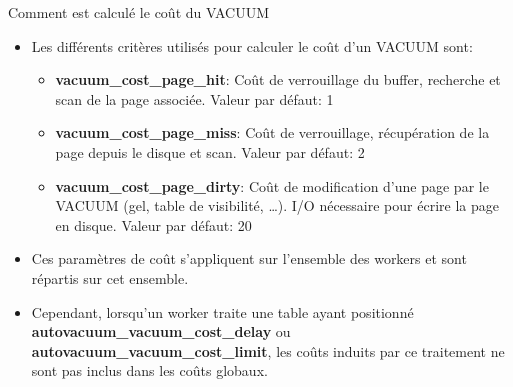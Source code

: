 \begin{frame}[fragile]{Comment est calculé le coût du VACUUM}
\label{vacuum-cost}

\begin{itemize}
   \item Les différents critères utilisés pour calculer le coût d'un VACUUM sont:
   \begin{itemize}
      \item \textbf{vacuum\_cost\_page\_hit}: Coût de verrouillage du buffer, recherche et scan de la page associée. Valeur par défaut: 1
      \item \textbf{vacuum\_cost\_page\_miss}: Coût de verrouillage, récupération de la page depuis le disque et scan. Valeur par défaut: 2
      \item \textbf{vacuum\_cost\_page\_dirty}: Coût de modification d'une page par le VACUUM (gel, table de visibilité, \ldots). I/O nécessaire pour écrire la page en disque. Valeur par défaut: 20
   \end{itemize}
   \item Ces paramètres de coût s'appliquent sur l'ensemble des workers et sont répartis sur cet ensemble.
   \item Cependant, lorsqu'un worker traite une table ayant positionné \textbf{autovacuum\_vacuum\_cost\_delay} ou \textbf{autovacuum\_vacuum\_cost\_limit}, les coûts induits par ce traitement ne sont pas inclus dans les coûts globaux.
\end{itemize}

\begin{tiny}
\begin{toile}
\end{toile}
\end{tiny}

\end{frame}


